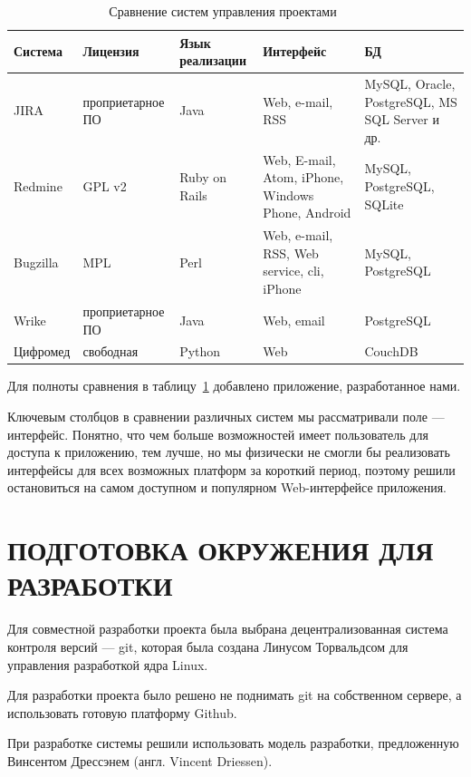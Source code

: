 \documentclass[14pt, a4paper]{extreport}
\begin{document}
\begin{table}[!htb]
  \caption{Сравнение систем управления проектами~\cite{jira_off}~\cite{redmine_off}~\cite{bugzilla_off}~\cite{wrike_off}}
  \label{tab:cmp_pm}
  \begin{center}
    \begin{tabularx}{\textwidth}{|l|X|X|X|X|}
      \hline
      Система & Лицензия & Язык реализации & Интерфейс & БД \\
      \hline
      JIRA & проприетарное ПО & Java & Web, e-mail, RSS & MySQL, Oracle, PostgreSQL, MS SQL Server и др. \\
      \hline
      Redmine & GPL v2 & Ruby on Rails & Web, E-mail, Atom, iPhone, Windows Phone, Android & MySQL, PostgreSQL, SQLite \\
      \hline
      Bugzilla & MPL & Perl & Web, e-mail, RSS, Web service, cli, iPhone & MySQL, PostgreSQL \\
      \hline
      Wrike & проприетарное ПО & Java & Web, email & PostgreSQL \\
      \hline
      Цифромед & свободная & Python & Web & CouchDB \\
      \hline
    \end{tabularx}
  \end{center}
\end{table}

Для полноты сравнения в таблицу~\ref{tab:cmp_pm} добавлено приложение, разработанное нами.

Ключевым столбцов в сравнении различных систем мы рассматривали поле --- интерфейс.
Понятно, что чем больше возможностей имеет пользователь для доступа к приложению, тем лучше,
но мы физически не смогли бы реализовать интерфейсы для всех возможных платформ за короткий период,
поэтому решили остановиться на самом доступном и популярном Web-интерфейсе приложения.

\chapter{\MakeTextUppercase{Подготовка окружения для разработки}}
Для совместной разработки проекта была выбрана децентрализованная система контроля
версий --- git, которая была создана Линусом Торвальдсом для управления разработкой
ядра Linux.~\cite{git_home}

Для разработки проекта было решено не поднимать git на собственном сервере, а использовать
готовую платформу Github.

При разработке системы решили использовать модель разработки, предложенную Винсентом
Дрессэнем (англ. Vincent Driessen).~\cite{git_branching_model}
\end{document}
